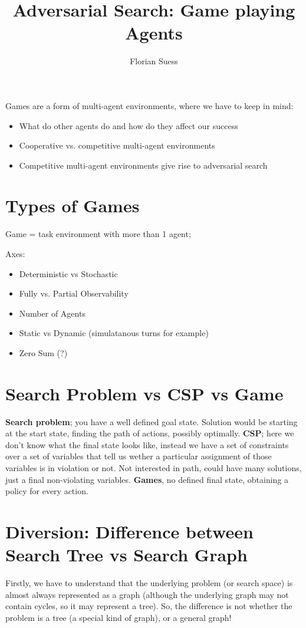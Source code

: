 \documentclass{article}
\begin{document}
\title{Adversarial Search: Game playing Agents}
\date{}
\author{Florian Suess}
\maketitle
Games are a form of multi-agent environments, where we have to keep in mind:

\begin{itemize}
	\item What do other agents do and how do they affect our success
	\item Cooperative vs. competitive multi-agent environments
	\item Competitive multi-agent environments give rise to adversarial search
\end{itemize}

\section*{Types of Games}
Game = task environment with more than 1 agent;

Axes:
\begin{itemize}
	\item Deterministic vs Stochastic
	\item Fully vs. Partial Observability
	\item Number of Agents
	\item Static vs Dynamic (simulatanous turns for example)
	\item Zero Sum (?)
\end{itemize}

\section*{Search Problem vs CSP vs Game}

\textbf{Search problem}; you have a well defined goal state. Solution would be starting at the start state, finding the path of actions, possibly optimally. \textbf{CSP}; here we don't know what the final state looks like, instead we have a set of constraints over a set of variables that tell us wether a particular assignment of those variables is in violation or not. Not interested in path, could have many solutions, just a final non-violating variables. \textbf{Games}, no defined final state, obtaining a policy for every action.

\section{Diversion: Difference between Search Tree vs Search Graph}
Firstly, we have to understand that the underlying problem (or search space) is almost always represented as a graph (although the underlying graph may not contain cycles, so it may represent a tree). So, the difference is not whether the problem is a tree (a special kind of graph), or a general graph!
\end{document}
